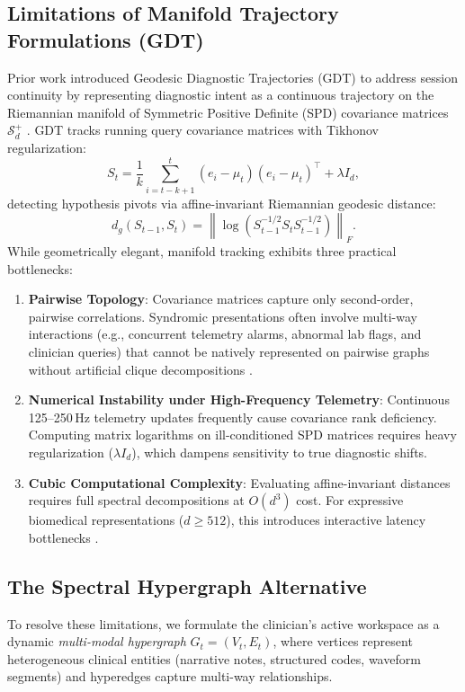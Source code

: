 \documentclass[10pt, onecolumn]{article}
\newcommand{\norm}[1]{\left\lVert#1\right\rVert}
\begin{document}
\subsection{Limitations of Manifold Trajectory Formulations (GDT)}
Prior work introduced Geodesic Diagnostic Trajectories (GDT) to address session continuity by representing diagnostic intent as a continuous trajectory on the Riemannian manifold of Symmetric Positive Definite (SPD) covariance matrices $\mathcal{S}_d^+$ \cite{arsigny2007geometric,pennec2006riemannian}. GDT tracks running query covariance matrices with Tikhonov regularization:
\begin{equation}
  S_t = \frac{1}{k}\sum_{i=t-k+1}^{t}(e_i - \mu_t)(e_i - \mu_t)^\top + \lambda I_d,
  \label{eq:spd_matrix}
\end{equation}
detecting hypothesis pivots via affine-invariant Riemannian geodesic distance:
\begin{equation}
  d_g(S_{t-1},S_t)=\norm{\log\!\left(S_{t-1}^{-1/2} S_t S_{t-1}^{-1/2}\right)}_F.
  \label{eq:geodesic_dist}
\end{equation}
While geometrically elegant, manifold tracking exhibits three practical bottlenecks:
\begin{enumerate}[(1)]
  \item \textbf{Pairwise Topology}: Covariance matrices capture only second-order, pairwise correlations. Syndromic presentations often involve multi-way interactions (e.g., concurrent telemetry alarms, abnormal lab flags, and clinician queries) that cannot be natively represented on pairwise graphs without artificial clique decompositions \cite{feng2019hypergraph}.
  \item \textbf{Numerical Instability under High-Frequency Telemetry}: Continuous 125--250\,Hz telemetry updates frequently cause covariance rank deficiency. Computing matrix logarithms on ill-conditioned SPD matrices requires heavy regularization ($\lambda I_d$), which dampens sensitivity to true diagnostic shifts.
  \item \textbf{Cubic Computational Complexity}: Evaluating affine-invariant distances requires full spectral decompositions at $O(d^3)$ cost. For expressive biomedical representations ($d \ge 512$), this introduces interactive latency bottlenecks \cite{huang2017riemannian}.
\end{enumerate}

\subsection{The Spectral Hypergraph Alternative}
To resolve these limitations, we formulate the clinician's active workspace as a dynamic \emph{multi-modal hypergraph} $G_t = (V_t, E_t)$, where vertices represent heterogeneous clinical entities (narrative notes, structured codes, waveform segments) and hyperedges capture multi-way relationships.
\end{document}
